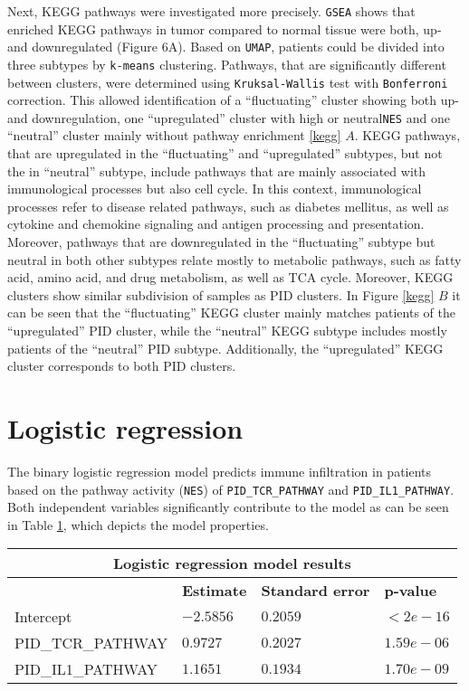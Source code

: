 \documentclass[
  parskip,
  oneside]{scrreprt}
\begin{document}
Next, KEGG pathways were investigated more precisely. \texttt{GSEA}
shows that enriched KEGG pathways in tumor compared to normal tissue
were both, up- and downregulated (Figure 6A). Based on \texttt{UMAP},
patients could be divided into three subtypes by \texttt{k-means}
clustering. Pathways, that are significantly different between clusters,
were determined using \texttt{Kruksal-Wallis} test with
\texttt{Bonferroni} correction. This allowed identification of a
``fluctuating'' cluster showing both up- and downregulation, one
``upregulated'' cluster with high or neutral\texttt{NES} and one
``neutral'' cluster mainly without pathway enrichment \cref{kegg} \(A\).
KEGG pathways, that are upregulated in the ``fluctuating'' and
``upregulated'' subtypes, but not the in ``neutral'' subtype, include
pathways that are mainly associated with immunological processes but
also cell cycle. In this context, immunological processes refer to
disease related pathways, such as diabetes mellitus, as well as cytokine
and chemokine signaling and antigen processing and presentation.\\
Moreover, pathways that are downregulated in the ``fluctuating'' subtype
but neutral in both other subtypes relate mostly to metabolic pathways,
such as fatty acid, amino acid, and drug metabolism, as well as TCA
cycle. Moreover, KEGG clusters show similar subdivision of samples as
PID clusters. In Figure \cref{kegg} \(B\) it can be seen that the
``fluctuating'' KEGG cluster mainly matches patients of the
``upregulated'' PID cluster, while the ``neutral'' KEGG subtype includes
mostly patients of the ``neutral'' PID subtype. Additionally, the
``upregulated'' KEGG cluster corresponds to both PID clusters.

\hypertarget{logistic-regression}{%
\section{Logistic regression}\label{logistic-regression}}

The binary logistic regression model predicts immune infiltration in
patients based on the pathway activity (\texttt{NES}) of
\texttt{PID\_TCR\_PATHWAY} and \texttt{PID\_IL1\_PATHWAY}. Both
independent variables significantly contribute to the model as can be
seen in Table \cref{tab}, which depicts the model properties.

\begin{table}[ht]
 \begin{tabular}{ |p{4.5cm}||p{3cm}|p{3cm}|p{3cm}|  }
  \hline
  \multicolumn{4}{|c|}{Logistic regression model results} \\
  \hline
   & \textbf{Estimate} & \textbf{Standard error} & \textbf{p-value}\\
  \hline
  Intercept   &  $-2.5856$  & $0.2059$ &   $<2e-16$\\
  PID\_TCR\_PATHWAY &   $0.9727$  & $0.2027$   & $1.59e-06$\\
  PID\_IL1\_PATHWAY & $1.1651$ & $0.1934$ &  $1.70e-09$\\
 \hline
 \end{tabular}
 \label{tab}
\end{table}
\end{document}
